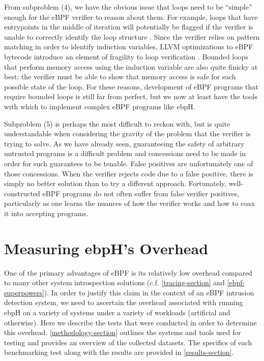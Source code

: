 \documentclass[
  12pt]{findlay}
\begin{document}
From subproblem (4), we have the obvious issue that loops need to be
``simple'' enough for the eBPF verifier to reason about them. For
example, loops that have entrypoints in the middle of iteration will
potentially be flagged if the verifier is unable to correctly identify
the loop structure \autocite{corbet18}. Since the verifier relies on
pattern matching in order to identify induction variables, LLVM
optimizations to eBPF bytecode introduce an element of fragility to loop
verification \autocite{corbet18}. Bounded loops that perform memory
access using the induction variable are also quite finicky at best; the
verifier must be able to show that memory access is safe for each
possible state of the loop. For these reasons, development of eBPF
programs that require bounded loops is still far from perfect, but we
now at least have the tools with which to implement complex eBPF
programs like ebpH.

Subproblem (5) is perhaps the most difficult to reckon with, but is
quite understandable when considering the gravity of the problem that
the verifier is trying to solve. As we have already seen, guaranteeing
the safety of arbitrary untrusted programs is a difficult problem and
concessions need to be made in order for such guarantees to be tenable.
False positives are unfortunately one of those concessions. When the
verifier rejects code due to a false positive, there is simply no better
solution than to try a different approach. Fortunately, well-constructed
eBPF programs do not often suffer from false verifier positives,
particularly as one learns the nuances of how the verifier works and how
to coax it into accepting programs.

\hypertarget{measuring-ebphs-overhead}{%
\section{Measuring ebpH's Overhead}\label{measuring-ebphs-overhead}}

One of the primary advantages of eBPF is its relatively low overhead
\autocite{gregg19bpf,starovoitov13,starovoitov14} compared to many other
system introspection solutions (c.f. \autoref{tracing-section} and
\autoref{ebpf-superpowers}). In order to justify this claim in the
context of an eBPF intrusion detection system, we need to ascertain the
overhead associated with running ebpH on a variety of systems under a
variety of workloads (artificial and otherwise). Here we describe the
tests that were conducted in order to determine this overhead.
\autoref{methodology-section} outlines the systems and tools used for
testing and provides an overview of the collected datasets. The
specifics of each benchmarking test along with the results are provided
in \autoref{results-section}.
\end{document}
